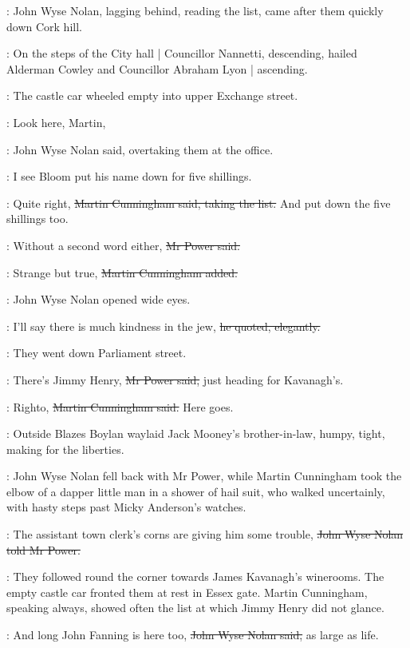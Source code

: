 :
John Wyse Nolan,
lagging behind, reading the list,
came after them
quickly down Cork hill.

:
On the steps of the City hall |
Councillor Nannetti, descending,
hailed Alderman Cowley and Councillor Abraham Lyon |
ascending.

:
The castle car wheeled empty into upper Exchange street.

\johnwyse:
Look here, Martin,

:
John Wyse Nolan said,
overtaking them at the  office.

\johnwyse:
I see Bloom put his name down for five shillings.

\cunningham:
Quite right,
\sout{Martin Cunningham said,
taking the list.}
And put down the
five shillings too.

\power:
Without a second word either,
\sout{Mr Power said.}

\cunningham:
Strange but true,
\sout{Martin Cunningham added.}

:
John Wyse Nolan opened wide eyes.

\johnwyse:
I'll say there is much kindness in the jew,
\sout{he quoted, elegantly.}

:
They went down Parliament street.

\power:
There's Jimmy Henry,
\sout{Mr Power said,}
just heading for Kavanagh's.

\cunningham:
Righto,
\sout{Martin Cunningham said.}
Here goes.

\begin{interject}
    :
    Outside 
    Blazes Boylan waylaid Jack Mooney's brother-in-law,
    humpy, tight,
    making for the liberties.
\end{interject}

:
John Wyse Nolan fell back with Mr Power,
while Martin Cunningham took the elbow
of a dapper little man in a shower of hail suit,
who walked uncertainly,
with hasty steps past Micky Anderson's watches.

\johnwyse:
The assistant town clerk's corns are giving him some trouble,
\sout{John Wyse Nolan told Mr Power.}%

:
They followed round the corner
towards James Kavanagh's winerooms.
The empty castle car fronted them at rest in Essex gate.
Martin Cunningham,
speaking always,
showed often the list at which Jimmy Henry did not glance.

\johnwyse:
And long John Fanning is here too,
\sout{John Wyse Nolan said,}
as large as life.

